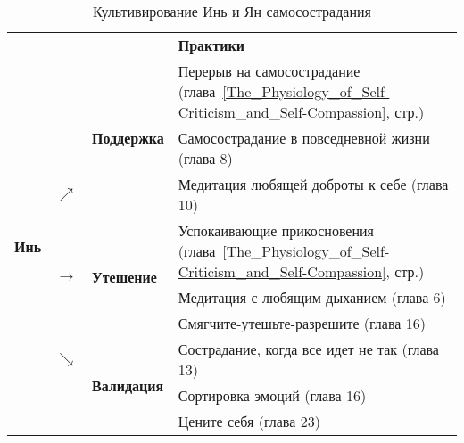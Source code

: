 \begin{table}[!h]{\LARGE }
	\begin{center}
		\caption{Культивирование Инь и Ян самосострадания}\label{tab:Yin_and_Yang}
		\setlength{\extrarowheight}{1mm}
		\begin{tabular}{p{1.2cm}p{3mm}p{2.6cm}||p{9.5cm}}
			\multicolumn{3}{r}{ } & {\large \textbf{Практики}}\\
			\cline{3-4}
			\multirow{9}{*}{{\LARGE\textbf{Инь}}} &  & \multirow{3}{*}{\textbf{Поддержка}} & {\small Перерыв на самосострадание (глава~\ref{The_Physiology_of_Self-Criticism_and_Self-Compassion}, стр.\:\pageref{IP:Self-Compassion_Break})}\\ 
			&  &  & {\small Самосострадание в повседневной жизни (глава 8)}\\ 
			& $\nearrow$ &  &{\small  Медитация любящей доброты к себе (глава 10)}\\ \cline{3-4}
			& \multirow{3}{*}{\textbf{$\rightarrow$}} & \multirow{3}{*}{\textbf{Утешение}} & {\small Успокаивающие прикосновения (глава~\ref{The_Physiology_of_Self-Criticism_and_Self-Compassion}, стр.\:\pageref{IP:Soothing_Touch})}\\
			&   &   & {\small Медитация с любящим дыханием (глава 6)}\\
			&   &   & {\small Смягчите-утешьте-разрешите (глава 16)}\\ \cline{3-4}
			& $\searrow$ & \multirow{3}{*}{\textbf{Валидация}} &{\small  Сострадание, когда все идет не так (глава 13)}\\
			&   &   & {\small Сортировка эмоций (глава 16)}\\
			&   &   & {\small Цените себя (глава 23)}\\ \cline{3-4}
		\end{tabular}
		\setlength{\extrarowheight}{0mm}
	\end{center}
\end{table} 
